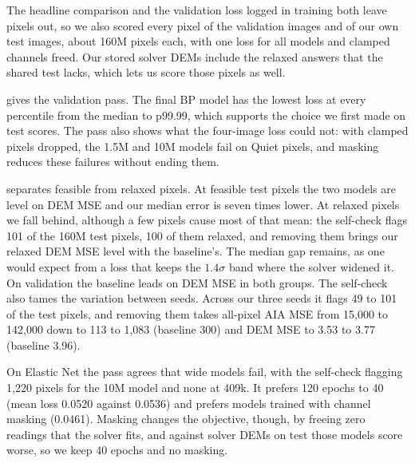 The headline comparison and the validation loss logged in training both leave pixels out, so we also scored every pixel of the validation images and of our own test images, about 160M pixels each, with one loss for all models and clamped channels freed. Our stored solver DEMs include the relaxed answers that the shared test lacks, which lets us score those pixels as well.

 gives the validation pass. The final BP model has the lowest loss at every percentile from the median to p99.99, which supports the choice we first made on test scores. The pass also shows what the four-image loss could not: with clamped pixels dropped, the 1.5M and 10M models fail on Quiet pixels, and masking reduces these failures without ending them.

 separates feasible from relaxed pixels. At feasible test pixels the two models are level on DEM MSE and our median error is seven times lower. At relaxed pixels we fall behind, although a few pixels cause most of that mean: the self-check flags 101 of the 160M test pixels, 100 of them relaxed, and removing them brings our relaxed DEM MSE level with the baseline's. The median gap remains, as one would expect from a loss that keeps the $1.4\sigma$ band where the solver widened it. On validation the baseline leads on DEM MSE in both groups. The self-check also tames the variation between seeds. Across our three seeds it flags 49 to 101 of the test pixels, and removing them takes all-pixel AIA MSE from 15,000 to 142,000 down to 113 to 1,083 (baseline 300) and DEM MSE to 3.53 to 3.77 (baseline 3.96).

On Elastic Net the pass agrees that wide models fail, with the self-check flagging 1,220 pixels for the 10M model and none at 409k. It prefers 120 epochs to 40 (mean loss 0.0520 against 0.0536) and prefers models trained with channel masking (0.0461). Masking changes the objective, though, by freeing zero readings that the solver fits, and against solver DEMs on test those models score worse, so we keep 40 epochs and no masking.
